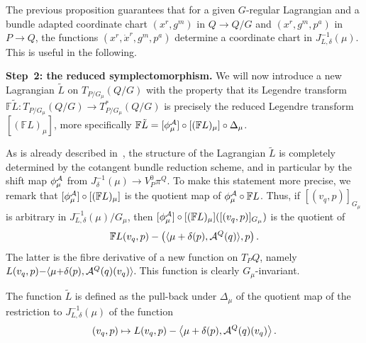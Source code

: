 \documentclass[pdftex]{sigma}
\newcommand{\A}{{\cal A}}
\newcommand{\F}{\mathbb{F}}
\begin{document}
The previous proposition guarantees that for a given $G$-regular Lagrangian and a bundle adapted coordinate chart $(x^r,g^m)$ in $Q\to Q/G$ and $(x^r,g^m,p^a)$ in $P\to Q$, the functions $(x^r,\dot x^r,g^m,p^a)$ determine a coordinate chart in $J^{-1}_{L,\delta}(\mu)$. This is useful in the following.

{\bf Step~2: the reduced symplectomorphism.}
We will now introduce a new Lagrangian $\tilde L$ on $T_{P/G_\mu}(Q/G)$ with the property that its Legendre transform $\F \tilde L: T_{P/G_\mu} (Q/G) \to T^*_{P/G_\mu}(Q/G)$ is precisely the reduced Legendre transform $[(\F L)_\mu]$, more specif\/ically $\F \tilde L= [\phi^\A_\mu]\circ[(\F L)_\mu] \circ \Delta_\mu$.

As is already described in~\cite{BC}, the structure of the Lagrangian $\tilde L$ is completely determined by the cotangent bundle reduction scheme, and in particular by the shift map $\phi^\A_\mu$ from $J^{-1}_\delta(\mu) \to V^0_P\pi^Q$. To make this statement more precise, we remark that $[\phi^\A_\mu]\circ[(\F L)_\mu]$ is the quotient map of $\phi^\A_\mu\circ \F L$. Thus, if $[(v_q,p)]_{G_\mu}$ is arbitrary in $J^{-1}_{L,\delta}(\mu)/G_\mu$, then $[\phi^\A_\mu]\circ[(\F L)_\mu]([(v_q,p)]_{G_\mu})$ is the quotient of \[\F L(v_q,p) - \left(\langle\mu+\delta(p),\A^Q(q)\rangle,p\right).\]
 The latter is the f\/ibre derivative of a new function on $T_PQ$, namely $L(v_q,p) {-} \langle \mu{+}\delta(p),\A^Q(q)(v_q)\rangle.\!$ This function is clearly $G_\mu$-invariant.

\begin{definition} The function $\tilde L$ is def\/ined as the pull-back under $\Delta_\mu$ of the quotient map of the restriction to $J^{-1}_{L,\delta}(\mu)$ of the function \[
(v_q,p) \mapsto L(v_q,p)- \left\langle \mu+\delta(p), \A^Q(q)(v_q)\right\rangle.
\]
\end{definition}
\end{document}
